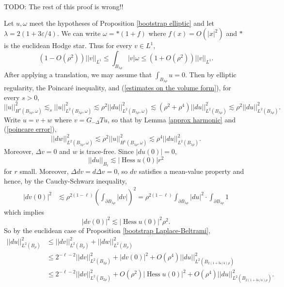 \documentclass[reqno,12pt,letterpaper]{amsart}
\DeclareMathOperator{\Hess}{Hess}
\theoremstyle{definition}
\numberwithin{equation}{section}
\begin{document}
TODO: The rest of this proof is wrong!!

Let $u, \omega$ meet the hypotheses of Proposition \ref{bootstrap elliptic} and let $\lambda = 2(1 + 3\varepsilon/4)$.
We can write $\omega = *(1 + f)$ where $f(x) = O(|x|^2)$ and $*$ is the euclidean Hodge star.
Thus for every $v \in L^1$,
\begin{equation}\label{estimates on the volume form}
(1 - O(\rho^2)) ||v||_{L^1} \leq \int_{B_{\lambda \rho}} |v|\omega \leq (1 + O(\rho^2)) ||v||_{L^1}.
\end{equation}
After applying a translation, we may assume that $\int_{B_{\lambda \rho}} u = 0$.
Then by elliptic regularity, the Poincar\'e inequality, and (\ref{estimates on the volume form}), for every $s > 0$,
\begin{equation}\label{poincare error}
||u||_{H^s(B_{\lambda \rho}, \omega)}^2 \lesssim_s ||u||_{L^2(B_{\lambda \rho}, \omega)}^2 \lesssim \rho^2 ||du||_{L^2(B_{\lambda \rho}, \omega)}^2 \lesssim (\rho^2 + \rho^4) ||du||_{L^2(B_{\lambda \rho})}^2 \lesssim \rho^2 ||du||_{L^2(B_{\lambda \rho})}^2.
\end{equation}
Write $u = v + w$ where $v = G_{-\Delta}Tu$, so that by Lemma \ref{approx harmonic} and (\ref{poincare error}),
$$||dw||_{L^2(B_{\lambda \rho}, \omega)}^2 \lesssim \rho^2 ||u||_{H^1(B_{\lambda \rho}, \omega)}^2 \lesssim \rho^4 ||du||_{L^2(B_{\lambda \rho})}^2.$$
Moreover, $\Delta v = 0$ and $w$ is trace-free.
Since $|du(0)| = 0$,
$$||du||_{B_r} \lesssim |\Hess u(0)|r^2$$
for $r$ small.
Moreover, $\Delta dv = d\Delta v = 0$, so $dv$ satisfies a mean-value property and hence, by the Cauchy-Schwarz inequality,
\begin{align*}
|dv(0)|^2 &\lesssim \rho^{2(1 - \ell)} \left(\int_{\partial B_{\lambda \rho}} |dv|\right)^2 = \rho^{2(1 - \ell)} \int_{\partial B_{\lambda \rho}} |du|^2 \cdot \int_{\partial B_{\lambda \rho}} 1
\end{align*}
which implies
$$|dv(0)|^2 \lesssim |\Hess u(0)|^2 \rho^2.$$
So by the euclidean case of Proposition \ref{bootstrap Laplace-Beltrami},
\begin{align*}
||du||_{L^2(B_\rho)}^2 &\leq ||dv||_{L^2(B_\rho)}^2 + ||dw||_{L^2(B_\rho)}^2 \\
&\leq 2^{-\ell-2} ||dv||_{L^2(B_{2\rho})}^2 + |dv(0)|^2 + O(\rho^4) ||du||_{L^2(B_{2(1 + 3\varepsilon/4)\rho})}^2\\
&\leq 2^{-\ell-2} ||dv||_{L^2(B_{2\rho})}^2 + O(\rho^2) |\Hess u(0)|^2 + O(\rho^4) ||du||_{L^2(B_{2(1 + 3\varepsilon/4)\rho})}^2.
\end{align*}
\end{document}
